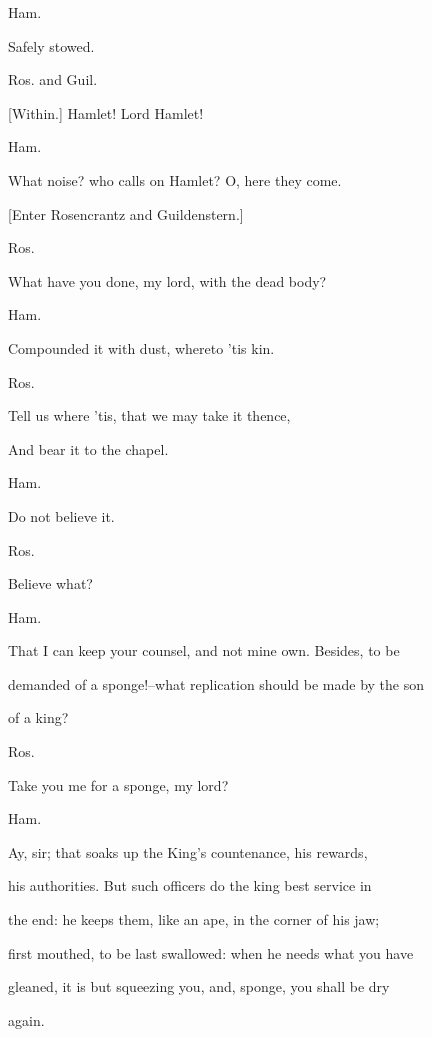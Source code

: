 \documentclass[12pt]{book}
\begin{document}
Ham.

Safely stowed.



Ros. and Guil.

[Within.] Hamlet! Lord Hamlet!



Ham.

What noise? who calls on Hamlet? O, here they come.



[Enter Rosencrantz and Guildenstern.]



Ros.

What have you done, my lord, with the dead body?



Ham.

Compounded it with dust, whereto 'tis kin.



Ros.

Tell us where 'tis, that we may take it thence,

And bear it to the chapel.



Ham.

Do not believe it.



Ros.

Believe what?



Ham.

That I can keep your counsel, and not mine own. Besides, to be

demanded of a sponge!--what replication should be made by the son

of a king?



Ros.

Take you me for a sponge, my lord?



Ham.

Ay, sir; that soaks up the King's countenance, his rewards,

his authorities. But such officers do the king best service in

the end: he keeps them, like an ape, in the corner of his jaw;

first mouthed, to be last swallowed: when he needs what you have

gleaned, it is but squeezing you, and, sponge, you shall be dry

again.
\end{document}
